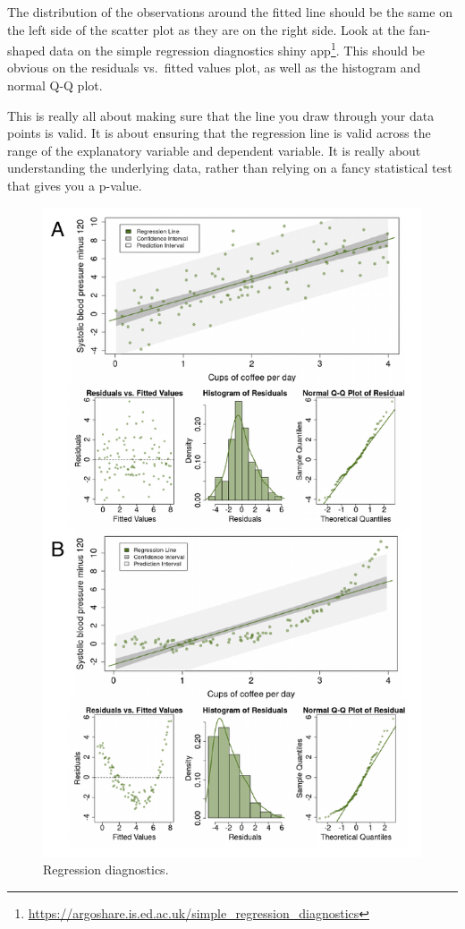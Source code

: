 \documentclass[12pt,]{krantz}
\renewcommand{\href}[2]{#2\footnote{\url{#1}}}
\theoremstyle{definition}
\theoremstyle{definition}
\theoremstyle{definition}
\theoremstyle{remark}
\begin{document}
The distribution of the observations around the fitted line should be
the same on the left side of the scatter plot as they are on the right
side. Look at the fan-shaped data on the
\href{https://argoshare.is.ed.ac.uk/simple_regression_diagnostics}{simple
regression diagnostics shiny app}. This should be obvious on the
residuals vs.~fitted values plot, as well as the histogram and normal
Q-Q plot.

This is really all about making sure that the line you draw through your
data points is valid. It is about ensuring that the regression line is
valid across the range of the explanatory variable and dependent
variable. It is really about understanding the underlying data, rather
than relying on a fancy statistical test that gives you a p-value.

\begin{figure}
\centering
\includegraphics{images/chapter07/3_diags.pdf}
\caption{\label{fig:chap07-fig-diags}Regression diagnostics.}
\end{figure}
\end{document}
